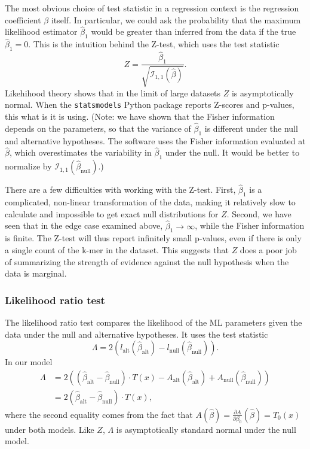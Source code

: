 \documentclass[12pt, letterpaper]{article}
\begin{document}
The most obvious choice of test statistic in a regression context is the regression coefficient $\beta$ itself.
In particular, we could ask the probability that the maximum likelihood estimator $\hat{\beta}_1$ would be greater than inferred from the data if the true $\hat{\beta}_1 = 0$.
This is the intuition behind the Z-test, which uses the test statistic
\begin{equation}
    Z = \frac{\hat{\beta}_1}{\sqrt{\mathcal{I}_{1,1}(\hat{\beta})}}.
\end{equation}
Likehihood theory shows that in the limit of large datasets $Z$ is asymptotically normal.
When the \texttt{statsmodels} Python package reports Z-scores and p-values, this what is it is using.
(Note: we have shown that the Fisher information depends on the parameters, so that the variance of $\hat{\beta}_1$ is different under the null and alternative hypotheses.
The software uses the Fisher information evaluated at $\hat{\beta}$, which overestimates the variability in $\hat{\beta}_1$ under the null.
It would be better to normalize by $\mathcal{I}_{1,1}(\hat{\beta}_\text{null})$.)

There are a few difficulties with working with the Z-test.
First, $\hat{\beta}_1$ is a complicated, non-linear transformation of the data, making it relatively slow to calculate and impossible to get exact null distributions for $Z$.
Second, we have seen that in the edge case examined above, $\hat{\beta}_1 \to \infty$, while the Fisher information is finite.
The Z-test will thus report infinitely small p-values, even if there is only a single count of the k-mer in the dataset.
This suggests that $Z$ does a poor job of summarizing the strength of evidence against the null hypothesis when the data is marginal.

\subsubsection{Likelihood ratio test}

The likelihood ratio test compares the likelihood of the ML parameters given the data under the null and alternative hypotheses.
It uses the test statistic
\begin{equation}
    \Lambda = 2\left(l_{\text{alt}}(\hat{\beta}_\text{alt}) - l_\text{null}(\hat{\beta}_\text{null})\right).
\end{equation}
In our model
\begin{align}
    \Lambda &= 2\left((\hat{\beta}_\text{alt} - \hat{\beta}_\text{null})\cdot T(x) - A_\text{alt}(\hat{\beta}_\text{alt}) + A_\text{null}(\hat{\beta}_\text{null})\right) \\
            &= 2(\hat{\beta}_\text{alt} - \hat{\beta}_\text{null}) \cdot T(x),
\end{align}
where the second equality comes from the fact that $A(\hat{\beta}) = \frac{\partial A}{\partial \beta_0}(\hat{\beta}) = T_0(x)$ under both models.
Like $Z$, $\Lambda$ is asymptotically standard normal under the null model.
\end{document}
